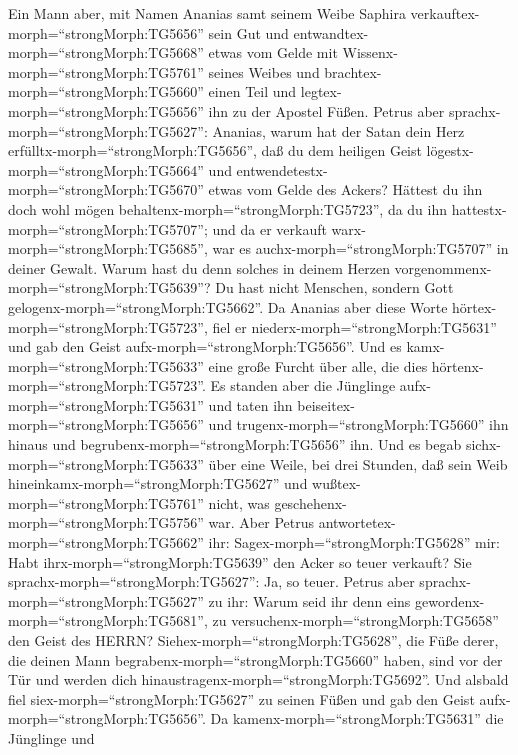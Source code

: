 Ein Mann aber, mit Namen Ananias samt seinem Weibe Saphira
verkauftex-morph=``strongMorph:TG5656'' sein Gut  und
entwandtex-morph=``strongMorph:TG5668'' etwas vom Gelde mit
Wissenx-morph=``strongMorph:TG5761'' seines Weibes und
brachtex-morph=``strongMorph:TG5660'' einen Teil und
legtex-morph=``strongMorph:TG5656'' ihn zu der Apostel Füßen.
 Petrus aber sprachx-morph=``strongMorph:TG5627'': Ananias,
warum hat der Satan dein Herz erfülltx-morph=``strongMorph:TG5656'', daß
du dem heiligen Geist lögestx-morph=``strongMorph:TG5664'' und
entwendetestx-morph=``strongMorph:TG5670'' etwas vom Gelde des Ackers?
 Hättest du ihn doch wohl mögen
behaltenx-morph=``strongMorph:TG5723'', da du ihn
hattestx-morph=``strongMorph:TG5707''; und da er verkauft
warx-morph=``strongMorph:TG5685'', war es
auchx-morph=``strongMorph:TG5707'' in deiner Gewalt. Warum hast du denn
solches in deinem Herzen vorgenommenx-morph=``strongMorph:TG5639''? Du
hast nicht Menschen, sondern Gott gelogenx-morph=``strongMorph:TG5662''.
 Da Ananias aber diese Worte
hörtex-morph=``strongMorph:TG5723'', fiel er
niederx-morph=``strongMorph:TG5631'' und gab den Geist
aufx-morph=``strongMorph:TG5656''. Und es
kamx-morph=``strongMorph:TG5633'' eine große Furcht über alle, die dies
hörtenx-morph=``strongMorph:TG5723''.  Es standen aber die
Jünglinge aufx-morph=``strongMorph:TG5631'' und taten ihn
beiseitex-morph=``strongMorph:TG5656'' und
trugenx-morph=``strongMorph:TG5660'' ihn hinaus und
begrubenx-morph=``strongMorph:TG5656'' ihn.  Und es begab
sichx-morph=``strongMorph:TG5633'' über eine Weile, bei drei Stunden,
daß sein Weib hineinkamx-morph=``strongMorph:TG5627'' und
wußtex-morph=``strongMorph:TG5761'' nicht, was
geschehenx-morph=``strongMorph:TG5756'' war.  Aber Petrus
antwortetex-morph=``strongMorph:TG5662'' ihr:
Sagex-morph=``strongMorph:TG5628'' mir: Habt
ihrx-morph=``strongMorph:TG5639'' den Acker so teuer verkauft? Sie
sprachx-morph=``strongMorph:TG5627'': Ja, so teuer.  Petrus
aber sprachx-morph=``strongMorph:TG5627'' zu ihr: Warum seid ihr denn
eins gewordenx-morph=``strongMorph:TG5681'', zu
versuchenx-morph=``strongMorph:TG5658'' den Geist des HERRN?
Siehex-morph=``strongMorph:TG5628'', die Füße derer, die deinen Mann
begrabenx-morph=``strongMorph:TG5660'' haben, sind vor der Tür und
werden dich hinaustragenx-morph=``strongMorph:TG5692''. 
Und alsbald fiel siex-morph=``strongMorph:TG5627'' zu seinen Füßen und
gab den Geist aufx-morph=``strongMorph:TG5656''. Da
kamenx-morph=``strongMorph:TG5631'' die Jünglinge und
